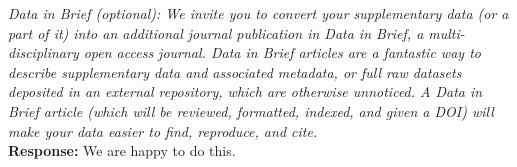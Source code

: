 \documentclass[11pt]{article}
\newcommand{\response}[2]{{\vspace{5mm}\noindent{\bf Comment:} \em #1}\\%
  {\bf Response:} #2}
\begin{document}
\response{Data in Brief (optional): We invite you to convert your
  supplementary data (or a part of it) into an additional journal
  publication in Data in Brief, a multi-disciplinary open access
  journal. Data in Brief articles are a fantastic way to describe
  supplementary data and associated metadata, or full raw datasets
  deposited in an external repository, which are otherwise
  unnoticed. A Data in Brief article (which will be reviewed,
  formatted, indexed, and given a DOI) will make your data easier to
  find, reproduce, and cite.}
{We are happy to do this.}
\end{document}
